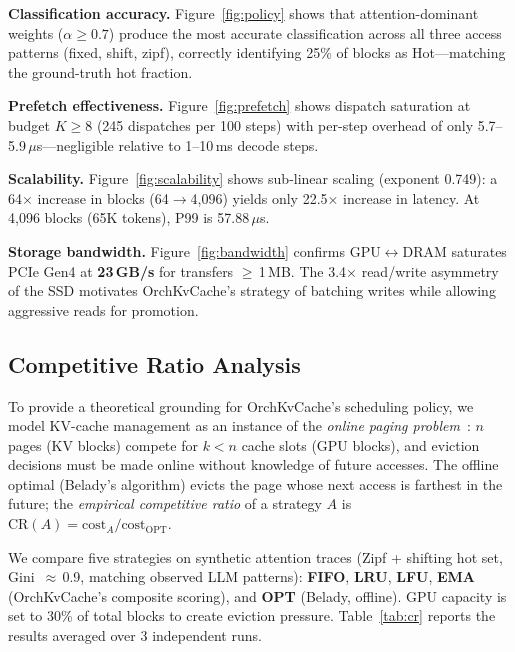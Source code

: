 \documentclass[conference]{IEEEtran}
\begin{document}
\textbf{Classification accuracy.} Figure~\ref{fig:policy} shows that attention-dominant weights ($\alpha \geq 0.7$) produce the most accurate classification across all three access patterns (fixed, shift, zipf), correctly identifying 25\% of blocks as Hot---matching the ground-truth hot fraction.

\textbf{Prefetch effectiveness.} Figure~\ref{fig:prefetch} shows dispatch saturation at budget $K \geq 8$ (245 dispatches per 100 steps) with per-step overhead of only 5.7--5.9\,$\mu$s---negligible relative to 1--10\,ms decode steps.

\textbf{Scalability.} Figure~\ref{fig:scalability} shows sub-linear scaling (exponent 0.749): a 64$\times$ increase in blocks (64$\to$4,096) yields only 22.5$\times$ increase in latency. At 4,096 blocks (65K tokens), P99 is 57.88\,$\mu$s.

\textbf{Storage bandwidth.} Figure~\ref{fig:bandwidth} confirms GPU$\leftrightarrow$DRAM saturates PCIe Gen4 at \textbf{23\,GB/s} for transfers $\geq$\,1\,MB. The 3.4$\times$ read/write asymmetry of the SSD motivates OrchKvCache's strategy of batching writes while allowing aggressive reads for promotion.

\subsection{Competitive Ratio Analysis}
\label{sec:competitive-ratio}

To provide a theoretical grounding for OrchKvCache's scheduling policy, we model KV-cache management as an instance of the \emph{online paging problem}~\cite{sleator-tarjan}: $n$ pages (KV blocks) compete for $k < n$ cache slots (GPU blocks), and eviction decisions must be made online without knowledge of future accesses. The offline optimal (Belady's algorithm) evicts the page whose next access is farthest in the future; the \emph{empirical competitive ratio} of a strategy $A$ is $\text{CR}(A) = \text{cost}_A / \text{cost}_{\text{OPT}}$.

We compare five strategies on synthetic attention traces (Zipf + shifting hot set, Gini~$\approx$\,0.9, matching observed LLM patterns): \textbf{FIFO}, \textbf{LRU}, \textbf{LFU}, \textbf{EMA} (OrchKvCache's composite scoring), and \textbf{OPT} (Belady, offline). GPU capacity is set to 30\% of total blocks to create eviction pressure. Table~\ref{tab:cr} reports the results averaged over 3 independent runs.
\end{document}
